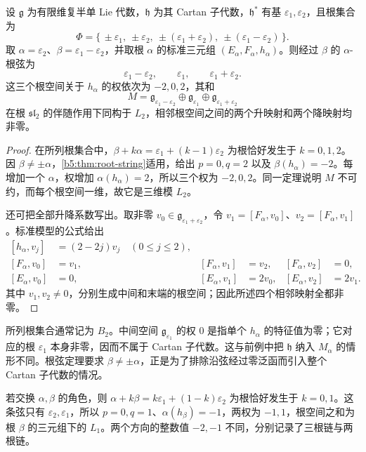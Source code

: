 \begin{corollary}\label{b5:cor:b2-three-root-string}
	设 \(\mathfrak g\) 为有限维复半单 Lie 代数，\(\mathfrak h\) 为其 Cartan 子代数，\(\mathfrak h^*\) 有基 \(\varepsilon_1,\varepsilon_2\)，且根集合为
	\[
		\Phi=\{\,\pm\varepsilon_1,\ \pm\varepsilon_2, \ \pm(\varepsilon_1+\varepsilon_2), \ \pm(\varepsilon_1-\varepsilon_2)\,\}.
	\]
	取 \(\alpha=\varepsilon_2\)、\(\beta=\varepsilon_1-\varepsilon_2\)，并取根 \(\alpha\) 的标准三元组 \((E_\alpha,F_\alpha,h_\alpha)\)。则经过 \(\beta\) 的 \(\alpha\)-根弦为
	\[
		\varepsilon_1-\varepsilon_2,\qquad \varepsilon_1,\qquad \varepsilon_1+\varepsilon_2.
	\]
	这三个根空间关于 \(h_\alpha\) 的权依次为 \(-2,0,2\)，其和
	\[
		M=\mathfrak g_{\varepsilon_1-\varepsilon_2} \oplus\mathfrak g_{\varepsilon_1} \oplus\mathfrak g_{\varepsilon_1+\varepsilon_2}
	\]
	在根 \(\mathfrak{sl}_2\) 的伴随作用下同构于 \(L_2\)，相邻根空间之间的两个升映射和两个降映射均非零。
\end{corollary}
\begin{proof}
	在所列根集合中，\(\beta+k\alpha=\varepsilon_1+(k-1)\varepsilon_2\) 为根恰好发生于 \(k=0,1,2\)。因 \(\beta\ne\pm\alpha\)，\cref{b5:thm:root-string}适用，给出 \(p=0,q=2\) 以及 \(\beta(h_\alpha)=-2\)。每增加一个 \(\alpha\)，权增加 \(\alpha(h_\alpha)=2\)，所以三个权为 \(-2,0,2\)。同一定理说明 \(M\) 不可约，而每个根空间一维，故它是三维模 \(L_2\)。

	还可把全部升降系数写出。取非零 \(v_0\in\mathfrak g_{\varepsilon_1+\varepsilon_2}\)，令 \(v_1=[F_\alpha,v_0]\)、\(v_2=[F_\alpha,v_1]\)。标准模型的公式给出
	\[
		\begin{aligned}
			[h_\alpha,v_j]&=(2-2j)v_j\quad(0\le j\le2),\\
			[F_\alpha,v_0]&=v_1,& [F_\alpha,v_1]&=v_2,& [F_\alpha,v_2]&=0,\\
			[E_\alpha,v_0]&=0,& [E_\alpha,v_1]&=2v_0,& [E_\alpha,v_2]&=2v_1.
		\end{aligned}
	\]
	其中 \(v_1,v_2\ne0\)，分别生成中间和末端的根空间；因此所述四个相邻映射全都非零。
\end{proof}

所列根集合通常记为 \(B_2\)。中间空间 \(\mathfrak g_{\varepsilon_1}\) 的权 \(0\) 是指单个 \(h_\alpha\) 的特征值为零；它对应的根 \(\varepsilon_1\) 本身非零，因而不属于 Cartan 子代数。这与前例中把 \(\mathfrak h\) 纳入 \(M_\alpha\) 的情形不同。根弦定理要求 \(\beta\ne\pm\alpha\)，正是为了排除沿弦经过零泛函而引入整个 Cartan 子代数的情况。

\ProseParagraphBreak

若交换 \(\alpha,\beta\) 的角色，则 \(\alpha+k\beta=k\varepsilon_1+(1-k)\varepsilon_2\) 为根恰好发生于 \(k=0,1\)。这条弦只有 \(\varepsilon_2,\varepsilon_1\)，所以 \(p=0,q=1\)、\(\alpha(h_\beta)=-1\)，两权为 \(-1,1\)，根空间之和为根 \(\beta\) 的三元组下的 \(L_1\)。两个方向的整数值 \(-2,-1\) 不同，分别记录了三根链与两根链。

